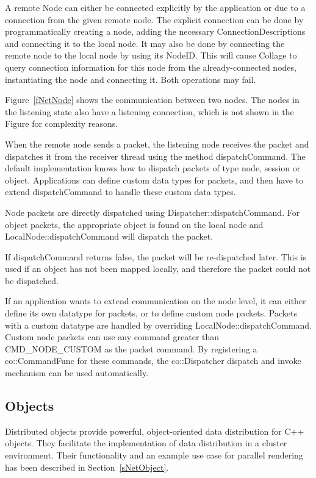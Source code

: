 \documentclass[10pt,a4]{scrartcl}
\newcommand{\fig}[1]{Figure~\ref{#1}}
\newcommand{\sref}[1]{Section~\ref{#1}}
\begin{document}
A remote \textsf{Node} can either be connected explicitly by the application or
due to a connection from the given remote node. The explicit connection can be
done by programmatically creating a node, adding the necessary
\textsf{ConnectionDescription}s and connecting it to the local node. It may also
be done by connecting the remote node to the local node by using its
\textsf{NodeID}. This will cause Collage to query connection information for
this node from the already-connected nodes, instantiating the node and
connecting it. Both operations may fail.

\fig{fNetNode} shows the communication between two nodes. The nodes in
the listening state also have a listening connection, which is not shown
in the Figure for complexity reasons.

When the remote node sends a packet, the listening node receives the
packet and dispatches it from the receiver thread using the method
\textsf{dispatchCommand}. The default implementation knows how to
dispatch packets of type node, session or object. Applications can
define custom data types for packets, and then have to extend
\textsf{dispatchCommand} to handle these custom data types.

Node packets are directly dispatched using
\textsf{Dispatcher::dispatchCommand}. For object packets, the appropriate object
is found on the local node and \textsf{LocalNode::dispatchCommand} will dispatch
the packet.

If \textsf{dispatchCommand} returns false, the packet will be
re-dispatched later. This is used if an object has not been mapped
locally, and therefore the packet could not be dispatched.

If an application wants to extend communication on the node level, it can either
define its own datatype for packets, or to define custom node packets. Packets
with a custom datatype are handled by overriding
\textsf{LocalNode::dispatchCommand}. Custom node packets can use any command
greater than \textsf{CMD\_NODE\_CUSTOM} as the packet command. By registering a
\textsf{co::CommandFunc} for these commands, the \textsf{co::Dispatcher}
dispatch and invoke mechanism can be used automatically.


\subsection{\label{sNetObject2}Objects}

Distributed objects provide powerful, object-oriented data distribution for C++
objects. They facilitate the implementation of data distribution in a cluster
environment. Their functionality and an example use case for parallel rendering
has been described in \sref{sNetObject}.
\end{document}
